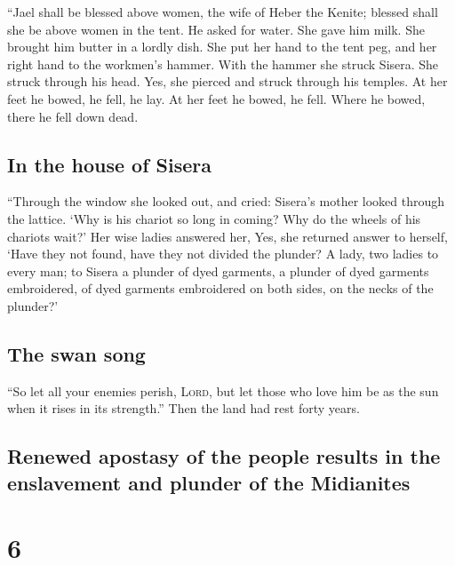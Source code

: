  ``Jael shall be blessed above women, the wife of Heber
the Kenite; blessed shall she be above women in the tent.
 He asked for water. She gave him milk. She brought him
butter in a lordly dish.  She put her hand to the tent
peg, and her right hand to the workmen's hammer. With the hammer she
struck Sisera. She struck through his head. Yes, she pierced and struck
through his temples.  At her feet he bowed, he fell, he
lay. At her feet he bowed, he fell. Where he bowed, there he fell down
dead.

\hypertarget{in-the-house-of-sisera}{%
\subsection{In the house of Sisera}\label{in-the-house-of-sisera}}

 ``Through the window she looked out, and cried: Sisera's
mother looked through the lattice. `Why is his chariot so long in
coming? Why do the wheels of his chariots wait?'  Her
wise ladies answered her, Yes, she returned answer to herself,
 `Have they not found, have they not divided the plunder?
A lady, two ladies to every man; to Sisera a plunder of dyed garments, a
plunder of dyed garments embroidered, of dyed garments embroidered on
both sides, on the necks of the plunder?'

\hypertarget{the-swan-song}{%
\subsection{The swan song}\label{the-swan-song}}

 ``So let all your enemies perish, \textsc{Lord}, but let
those who love him be as the sun when it rises in its strength.'' Then
the land had rest forty years.

\hypertarget{renewed-apostasy-of-the-people-results-in-the-enslavement-and-plunder-of-the-midianites}{%
\subsection{Renewed apostasy of the people results in the enslavement
and plunder of the
Midianites}\label{renewed-apostasy-of-the-people-results-in-the-enslavement-and-plunder-of-the-midianites}}

\hypertarget{section-5}{%
\section{6}\label{section-5}}


